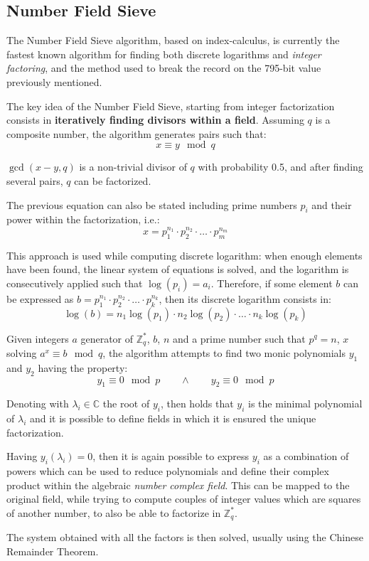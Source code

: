 \subsection{Number Field Sieve}
The Number Field Sieve algorithm, based on index-calculus, is currently the fastest known algorithm for finding both discrete logarithms and \textit{integer factoring}, and the method used to break the record on the 795-bit value previously mentioned. 

The key idea of the Number Field Sieve, starting from integer factorization consists in \textbf{iteratively finding divisors within a field}. Assuming $q$ is a composite number, the algorithm generates pairs such that:
$$x \equiv y \mod q$$

$\gcd(x - y, q)$ is a non-trivial divisor of $q$ with probability 0.5, and after finding several pairs, $q$ can be factorized.

The previous equation can also be stated including prime numbers $p_i$ and their power within the factorization, i.e.:
$$x = p_1^{n_1} \cdot p_2^{n_2} \cdot \dots \cdot p_m^{n_m}$$

This approach is used while computing discrete logarithm: when enough elements have been found, the linear system of equations is solved, and the logarithm is consecutively applied such that $\log(p_i) = a_i$. Therefore, if some element $b$ can be expressed as $b = p_1^{n_1} \cdot p_2^{n_2} \cdot \dots \cdot p_k^{n_k}$, then its discrete logarithm consists in:
$$\log(b) = n_1\log(p_1) \cdot n_2\log(p_2) \cdot \dots \cdot n_k\log(p_k)$$

Given integers $a$ generator of $\mathbb{Z}^*_q$, $b$, $n$ and a prime number such that $p^q = n$, $x$ solving $a^x \equiv b \mod q$, the algorithm attempts to find two monic polynomials $y_1$ and $y_2$ having the property:
$$y_1 \equiv 0 \mod p \qquad \land \qquad y_2 \equiv 0 \mod p$$

Denoting with $\lambda_i \in \mathbb{C}$ the root of $y_i$, then holds that $y_i$ is the minimal polynomial of $\lambda_i$ and it is possible to define fields in which it is ensured the unique factorization.

Having $y_i(\lambda_i) = 0$, then it is again possible to express $y_i$ as a combination of powers which can be used to reduce polynomials and define their complex product within the algebraic \textit{number complex field}. This can be mapped to the original field, while trying to compute couples of integer values which are squares of another number, to also be able to factorize in $\mathbb{Z}^*_q$.

The system obtained with all the factors is then solved, usually using the Chinese Remainder Theorem.  


